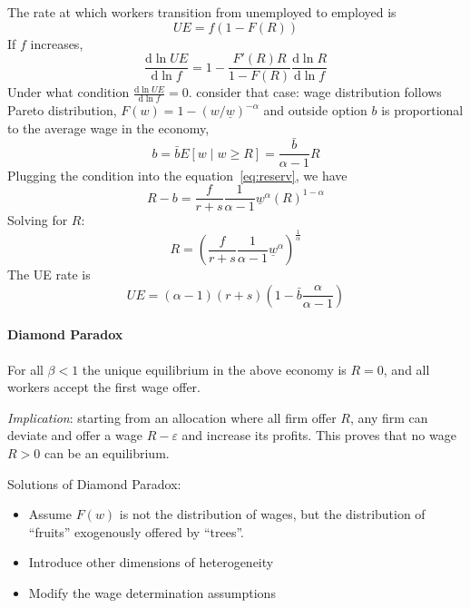 \documentclass[11pt,a4paper]{article}
\begin{document}
The rate at which workers transition from unemployed to employed is 
\begin{equation}
  UE = f(1-F(R))
\end{equation}
If $f$ increases,
\begin{equation}
  \frac{\mathrm{d}\ln UE }{\mathrm{d} \ln f} = 1- \frac{F'(R)R}{1-F(R)}\frac{\mathrm{d} \ln R }{\mathrm{d} \ln f}
\end{equation}
Under what condition $\frac{\mathrm{d}\ln UE }{\mathrm{d}\ln f } =0 $. 
consider that case: wage distribution follows Pareto distribution, $F(w) = 1-(w/\underline{w})^{-\alpha}$ and outside option $b$ is proportional to the average wage in the economy,
\begin{equation}
  b = \bar{b} E[w\mid w\geq R] = \frac{\bar{b}}{\alpha-1}R
\end{equation}
Plugging the condition into the equation~\eqref{eq:reserv}, we have
\begin{equation}
  R - b = \frac{f}{r+s} \frac{1}{\alpha-1} \underline{w}^\alpha (R)^{1-\alpha}
\end{equation}
Solving for $R$: 
\begin{equation}
  R = \left(\frac{f}{r+s}\frac{1}{\alpha-1}\underline{w}^\alpha\right)^{\frac{1}{\alpha}}
\end{equation}
The UE rate is 
\begin{equation}
  UE = (\alpha-1)(r+s)(1-\bar{b} \frac{\alpha}{\alpha-1})
\end{equation}

\paragraph{Diamond Paradox}
For all $\beta<1$ the unique equilibrium in the above economy is $R=0$, and all workers accept the first wage offer. 

\textit{Implication}: starting from an allocation where all firm offer $R$, any firm can deviate and offer a wage $R-\varepsilon$ and increase its profits. This proves that no wage $R>0$ can be an equilibrium. 

Solutions of Diamond Paradox:
\begin{itemize}
  \item Assume $F(w)$ is not the distribution of wages, but the distribution of ``fruits'' exogenously offered by ``trees''.
  \item Introduce other dimensions of heterogeneity
  \item Modify the wage determination assumptions
\end{itemize}
\end{document}
